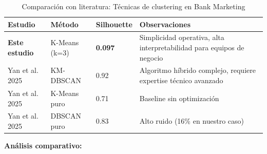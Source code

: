 \documentclass[12pt,letterpaper]{article}
\begin{document}
\begin{table}[H]
\centering
\caption{Comparación con literatura: Técnicas de clustering en Bank Marketing}
\label{tab:clustering_literatura}
\begin{tabular}{@{}lllp{5.5cm}@{}}
\toprule
\textbf{Estudio} & \textbf{Método} & \textbf{Silhouette} & \textbf{Observaciones} \\
\midrule
\textbf{Este estudio} & K-Means (k=3) & \textbf{0.097} & Simplicidad operativa, alta interpretabilidad para equipos de negocio \\
\addlinespace
Yan et al. 2025 & KM-DBSCAN & 0.92 & Algoritmo híbrido complejo, requiere expertise técnico avanzado \\
\addlinespace
Yan et al. 2025 & K-Means puro & 0.71 & Baseline sin optimización \\
\addlinespace
Yan et al. 2025 & DBSCAN puro & 0.83 & Alto ruido (16\% en nuestro caso) \\
\bottomrule
\end{tabular}
\end{table}

\textbf{Análisis comparativo:}
\end{document}
